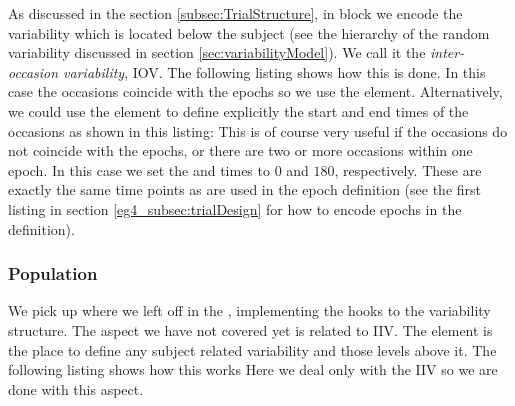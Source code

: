 
As discussed in the section \ref{subsec:TrialStructure}, in  block 
we encode the variability which is located below the subject (see the 
hierarchy of the random variability discussed in section \ref{sec:variabilityModel}).
We call it the \textit{inter-occasion variability}, IOV. The following listing 
 shows how this is done. 
In this case the occasions coincide with the epochs 
so we use the  element. Alternatively, we could use the 
element to define explicitly the start and end times of the occasions as shown 
in this listing: 
This is of course very useful if the occasions do not
coincide with the epochs, or there are two or more occasions within one epoch.
In this case we set the  and  times to $0$ and $180$, respectively.
These are exactly the same time points as are used in the epoch definition 
(see the first listing in section \ref{eg4_subsec:trialDesign} for how to encode epochs in the 
 definition).   

 

\subsubsection{Population}
We pick up where we left off in the , implementing
the hooks to the variability structure. The aspect we have not covered
yet is related to IIV.  The  element is the place to
define any subject related variability and those levels above
it. The following listing shows how this works 
Here we deal only with the IIV so we are done with this aspect.


